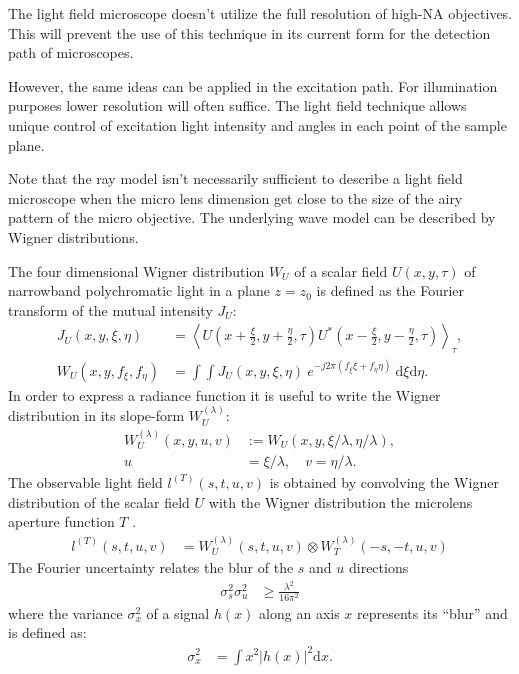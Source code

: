 The light field microscope doesn't utilize the full resolution of
high-NA objectives. This will prevent the use of this technique in its
current form for the detection path of microscopes.

However, the same ideas can be applied in the excitation path. For
illumination purposes lower resolution will often suffice. The light
field technique allows unique control of excitation light intensity
and angles in each point of the sample plane.


{\color{red}
Note that the ray model isn't necessarily sufficient to describe a
light field microscope when the micro lens dimension get close to the
size of the airy pattern of the micro objective. The underlying wave
model can be described by Wigner distributions.

The four dimensional Wigner  distribution $W_U$ of a scalar field
$U(x,y,\tau)$ of narrowband polychromatic light in a plane $z=z_0$ is
defined as the Fourier transform of the mutual intensity $J_U$:
\begin{align}
  J_U(x,y,\xi,\eta)&=\left\langle U\left(x+\frac{\xi}{2},y+\frac{\eta}{2},\tau\right) U^*\left(x-\frac{\xi}{2},y-\frac{\eta}{2},\tau\right) \right\rangle_\tau,\\
  W_U(x,y,f_\xi,f_\eta)&=\int\!\!\!\!\int J_U(x,y,\xi,\eta)\ e^{-j2\pi(f_\xi\xi+f_\eta\eta)}\ \textrm{d}\xi\textrm{d}\eta.
\end{align}
In order to express a radiance function it is useful to write the Wigner distribution in its slope-form $W_U^{(\lambda)}$:
\begin{align}
  \label{eq:wigner-slope}
  W_U^{(\lambda)}(x,y,u,v)&:=W_U(x,y,\xi/\lambda,\eta/\lambda),\\
  u&=\xi/\lambda, \quad v=\eta/\lambda.
\end{align}
The observable light field $l^{(T)}(s,t,u,v)$ is obtained by
convolving the Wigner distribution of the scalar field $U$ with the
Wigner distribution the microlens aperture function $T$
\citep{Zhang2009}. 
\begin{align}
  \label{eq:lightfield}
  l^{(T)}(s,t,u,v)
  &=
  W_U^{(\lambda)}(s,t,u,v)\otimes
  W_T^{(\lambda)}(-s,-t,u,v)  
\end{align}
The Fourier uncertainty relates the blur of the $s$ and $u$ directions
\begin{align}
  \label{eq:uncertainty}
  \sigma_s^2\sigma_u^2&\ge\frac{\lambda^2}{16\pi^2}
\end{align}
where the variance $\sigma_x^2$ of a signal $h(x)$ along an axis $x$
represents its ``blur'' and is defined as:
\begin{align}
  \label{eq:variance}
  \sigma_x^2&=\int x^2|h(x)|^2\textrm{d}x.
\end{align}
}

